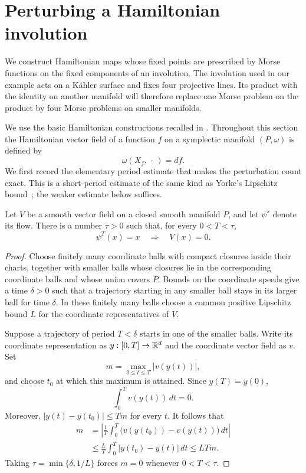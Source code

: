 \section{Perturbing a Hamiltonian involution}\label{sec:involution}

We construct Hamiltonian maps whose fixed points are prescribed by Morse
functions on the fixed components of an involution.  The involution used in
our example acts on a K\"ahler surface and fixes four projective lines.  Its
product with the identity on another manifold will therefore replace one
Morse problem on the product by four Morse problems on smaller manifolds.

We use the basic Hamiltonian constructions recalled in \cite{McDuffSalamon2017}. Throughout this section the Hamiltonian vector field of a function $f$ on a
symplectic manifold $(P,\omega)$ is defined by
\[
  \omega(X_f,\,\cdot\,)=df.
\]
We first record the elementary period estimate that makes the perturbation
count exact.  This is a short-period estimate of the same kind as
Yorke's Lipschitz bound~\cite{Yorke1969}; the weaker estimate below suffices.

\begin{lemma}\label{lem:short-period}
Let $V$ be a smooth vector field on a closed smooth manifold $P$, and let
$\psi^s$ denote its flow.  There is a number $\tau>0$ such that, for every
$0<T<\tau$,
\[
  \psi^T(x)=x \quad\Longrightarrow\quad V(x)=0.
\]
\end{lemma}

\begin{proof}
Choose finitely many coordinate balls with compact closures inside their
charts, together with smaller balls whose closures lie in the corresponding
coordinate balls and whose union covers $P$.  Bounds on the coordinate
speeds give a time $\delta>0$ such that a
trajectory starting in any smaller ball stays in its larger ball for time
$\delta$.  In these finitely many balls choose a common positive Lipschitz
bound $L$ for the coordinate representatives of $V$.

Suppose a trajectory of period $T<\delta$ starts in one of the smaller balls.
Write its coordinate representation as $y:[0,T]\to\mathbb R^d$ and the coordinate
vector field as $v$.  Set
\[
  m=\max_{0\le t\le T}|v(y(t))|,
\]
and choose $t_0$ at which this maximum is attained.  Since $y(T)=y(0)$,
\[
  \int_0^T v(y(t))\,dt=0.
\]
Moreover, $|y(t)-y(t_0)|\le Tm$ for every $t$.  It follows that
\[
\begin{split}
  m
  &=\left|\frac1T\int_0^T
      \bigl(v(y(t_0))-v(y(t))\bigr)\,dt\right|\\
  &\le \frac LT\int_0^T|y(t_0)-y(t)|\,dt
   \le LTm.
\end{split}
\]
Taking $\tau=\min\{\delta,1/L\}$ forces $m=0$ whenever $0<T<\tau$.
\end{proof}

